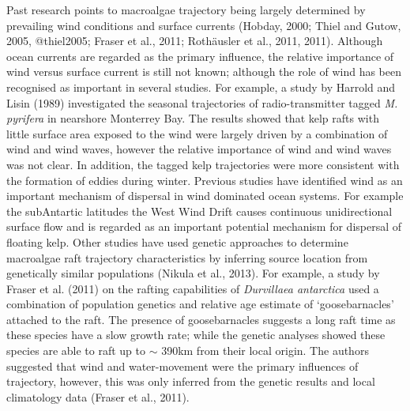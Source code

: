 \documentclass[
]{article}
\begin{document}
Past research points to macroalgae trajectory being largely determined
by prevailing wind conditions and surface currents (Hobday, 2000; Thiel
and Gutow, 2005, @thiel2005; Fraser et al., 2011; Rothäusler et al.,
2011, 2011). Although ocean currents are regarded as the primary
influence, the relative importance of wind versus surface current is
still not known; although the role of wind has been recognised as
important in several studies. For example, a study by Harrold and Lisin
(1989) investigated the seasonal trajectories of radio-transmitter
tagged \emph{M. pyrifera} in nearshore Monterrey Bay. The results showed
that kelp rafts with little surface area exposed to the wind were
largely driven by a combination of wind and wind waves, however the
relative importance of wind and wind waves was not clear. In addition,
the tagged kelp trajectories were more consistent with the formation of
eddies during winter. Previous studies have identified wind as an
important mechanism of dispersal in wind dominated ocean systems. For
example the subAntartic latitudes the West Wind Drift causes continuous
unidirectional surface flow and is regarded as an important potential
mechanism for dispersal of floating kelp. Other studies have used
genetic approaches to determine macroalgae raft trajectory
characteristics by inferring source location from genetically similar
populations (Nikula et al., 2013). For example, a study by Fraser et al.
(2011) on the rafting capabilities of \emph{Durvillaea antarctica} used
a combination of population genetics and relative age estimate of
`goosebarnacles' attached to the raft. The presence of goosebarnacles
suggests a long raft time as these species have a slow growth rate;
while the genetic analyses showed these species are able to raft up to
\(\sim\) 390km from their local origin. The authors suggested that wind
and water-movement were the primary influences of trajectory, however,
this was only inferred from the genetic results and local climatology
data (Fraser et al., 2011).
\end{document}
